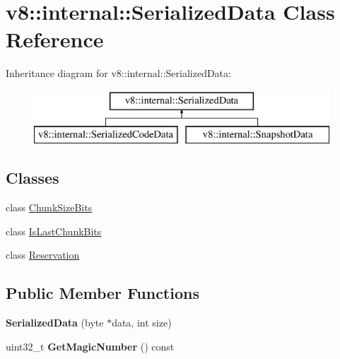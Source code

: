 \hypertarget{classv8_1_1internal_1_1_serialized_data}{}\section{v8\+:\+:internal\+:\+:Serialized\+Data Class Reference}
\label{classv8_1_1internal_1_1_serialized_data}
Inheritance diagram for v8\+:\+:internal\+:\+:Serialized\+Data\+:\begin{figure}[H]
\begin{center}
\leavevmode
\includegraphics[height=2.000000cm]{classv8_1_1internal_1_1_serialized_data}
\end{center}
\end{figure}
\subsection*{Classes}
\begin{DoxyCompactItemize}
\item 
class \hyperlink{classv8_1_1internal_1_1_serialized_data_1_1_chunk_size_bits}{Chunk\+Size\+Bits}
\item 
class \hyperlink{classv8_1_1internal_1_1_serialized_data_1_1_is_last_chunk_bits}{Is\+Last\+Chunk\+Bits}
\item 
class \hyperlink{classv8_1_1internal_1_1_serialized_data_1_1_reservation}{Reservation}
\end{DoxyCompactItemize}
\subsection*{Public Member Functions}
\begin{DoxyCompactItemize}
\item 
{\bfseries Serialized\+Data} (byte $\ast$data, int size)\hypertarget{classv8_1_1internal_1_1_serialized_data_a742e9fe1c13ef44ebe723558a9b33326}{}\label{classv8_1_1internal_1_1_serialized_data_a742e9fe1c13ef44ebe723558a9b33326}

\item 
uint32\+\_\+t {\bfseries Get\+Magic\+Number} () const \hypertarget{classv8_1_1internal_1_1_serialized_data_a6bac5981722592d6ba02e496370a79f3}{}\label{classv8_1_1internal_1_1_serialized_data_a6bac5981722592d6ba02e496370a79f3}

\end{DoxyCompactItemize}
